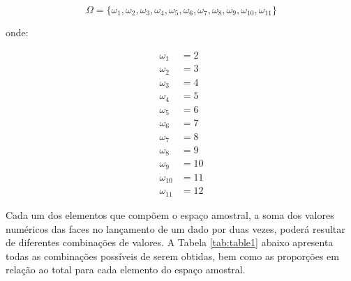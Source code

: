 \documentclass[
]{book}
\begin{document}
\[
\Omega = \{\omega_{1}, \omega_{2}, \omega_{3}, \omega_{4}, \omega_{5}, \omega_{6}, \omega_{7}, \omega_{8}, \omega_{9}, \omega_{10}, \omega_{11}\}
\]

onde:

\begin{align*}
\omega_{1} & =  2\\
\omega_{2} & =  3\\
\omega_{3} & = 4\\
\omega_{4} & = 5\\
\omega_{5} & = 6\\
\omega_{6} & = 7 \\
\omega_{7} & = 8\\
\omega_{8} & = 9\\
\omega_{9} & = 10\\
\omega_{10} & = 11\\
\omega_{11} & = 12     
\end{align*}

Cada um dos elementos que compõem o espaço amostral, a soma dos valores numéricos das faces no lançamento de um dado por duas vezes, poderá resultar de diferentes combinações de valores. A Tabela \ref{tab:table1} abaixo apresenta todas as combinações possíveis de serem obtidas, bem como as proporções em relação ao total para cada elemento do espaço amostral.

\hfill\break
\end{document}

